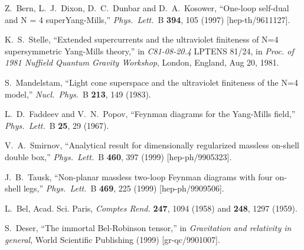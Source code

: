 \documentclass[12pt]{livrev}
\begin{document}
\begin{thebibliography}{99}
Z.~Bern, L.~J.~Dixon, D.~C.~Dunbar and D.~A.~Kosower,
``One-loop self-dual and N = 4 superYang-Mills,''
{\it Phys.\ Lett.}\ B {\bf 394}, 105 (1997)
[hep-th/9611127].

K.~S.~Stelle, ``Extended supercurrents and the
ultraviolet finiteness of N=4 supersymmetric Yang-Mills theory,'' in
{\it C81-08-20.4} LPTENS 81/24,  in {\it Proc. of 1981 Nuffield Quantum
Gravity Workshop}, London, England, Aug 20, 1981.

S.~Mandelstam,
``Light cone superspace and the ultraviolet finiteness of the N=4 model,''
{\it Nucl.\ Phys.}\ B {\bf 213}, 149 (1983).

L.~D.~Faddeev and V.~N.~Popov,
``Feynman diagrams for the Yang-Mills field,''
{\it Phys.\ Lett.}\ B {\bf 25}, 29 (1967).

V.~A.~Smirnov,
``Analytical result for dimensionally regularized massless on-shell  
 double box,''
{\it Phys.\ Lett.}\ B {\bf 460}, 397 (1999)
[hep-ph/9905323].

J.~B.~Tausk,
``Non-planar massless two-loop Feynman diagrams with four on-shell legs,''
{\it Phys.\ Lett.}\ B {\bf 469}, 225 (1999)
[hep-ph/9909506].

L.\ Bel, Acad. Sci. Paris, {\it Comptes Rend.} {\bf 247}, 1094 (1958) 
and {\bf 248}, 1297 (1959).

S.~Deser,
``The immortal Bel-Robinson tensor,''
in {\it Gravitation and relativity in general}, World Scientific 
Publishing (1999)
[gr-qc/9901007].


\end{thebibliography}
\end{document}
